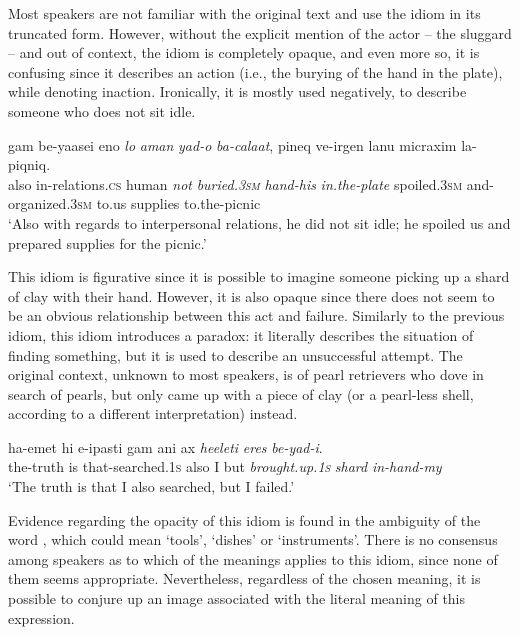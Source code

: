 \documentclass[output=paper]{langsci/langscibook}
\begin{document}
Most  speakers are not familiar with the original text and use the idiom in its truncated form. However, without the explicit mention of the actor -- the sluggard -- and out of context, the idiom is completely opaque, and even more so, it is confusing since it describes an action (i.e., the burying of the hand in the plate), while denoting inaction. Ironically, it is mostly used negatively, to describe someone who does not sit idle.


	\ea\label{she:taman-canon}
    	\gll gam be-ya{\het}asei {\alef}eno{\shin} \textit{lo} \textit{{\tet}aman} \textit{yad-o} \textit{ba-cala{\het}at}, pineq ve-{\alef}irgen lanu micraxim la-piqniq.\\
    	   also in-relations.\textsc{cs} human \textit{not} \textit{buried.\textsc{3sm}} \textit{hand-his} \textit{in.the-plate} spoiled.\textsc{3sm} and-organized.\textsc{3sm} to.us supplies to.the-picnic\\
    	\glt `Also with regards to interpersonal relations, he did not sit idle; he spoiled us and prepared supplies for the picnic.'
	\z

\noindent{}
This idiom is figurative since it is possible to imagine someone picking up a shard of clay with their hand. However, it is also opaque since there does not seem to be an obvious relationship between this act and failure. Similarly to the previous idiom, this idiom introduces a paradox: it literally describes the situation of finding something, but it is used to describe an unsuccessful attempt. The original context, unknown to most speakers, is of pearl retrievers who dove in search of pearls, but only came up with a piece of clay (or a pearl-less shell, according to a different interpretation) instead.

	\ea\label{she:xeres-canon}
	\gll ha-{\alef}emet hi {\shin}e-{\het}ipasti gam {\alef}ani {\alef}ax \textit{he{\ayin}eleti} \textit{{\het}eres} \textit{be-yad-i}.\\
	   the-truth is that-searched.\textsc{1s} also I but \textit{brought.up.\textsc{1s}} \textit{shard} \textit{in-hand-my} \\
	\glt `The truth is that I also searched, but I failed.'
	\z	

\noindent{}
Evidence regarding the opacity of this idiom is found in the ambiguity of the word , which could mean `tools', `dishes' or `instruments'. There is no consensus among speakers as to which of the meanings applies to this idiom, since none of them seems appropriate. Nevertheless, regardless of the chosen meaning, it is possible to conjure up an image associated with the literal meaning of this expression.
\end{document}
